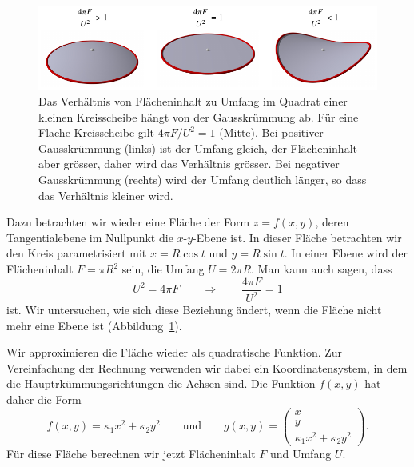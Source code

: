 \begin{figure}
\centering
\includegraphics{chapters/tikz/4pifu2.pdf}
\caption{Das Verhältnis von Flächeninhalt zu Umfang im Quadrat einer
kleinen Kreisscheibe hängt von der Gausskrümmung ab. 
Für eine Flache Kreisscheibe gilt $4\pi F/U^2=1$ (Mitte).
Bei positiver Gausskrümmung (links) ist der Umfang gleich, der Flächeninhalt
aber grösser, daher wird das Verhältnis grösser.
Bei negativer Gausskrümmung (rechts) wird der Umfang deutlich länger, so dass
das Verhältnis kleiner wird.
\label{skript:kurven:4pifu2vis}}
\end{figure}
Dazu betrachten wir wieder eine Fläche der Form $z=f(x,y)$, deren
Tangentialebene im Nullpunkt die $x$-$y$-Ebene ist.
In dieser Fläche betrachten wir den Kreis parametrisiert mit
$x=R\cos t$ und $y=R\sin t$.
In einer Ebene wird der Flächeninhalt $F=\pi R^2$ sein, die Umfang $U=2\pi R$.
Man kann auch sagen, dass
\[
U^2 = 4\pi F
\qquad\Rightarrow\qquad
\frac{4\pi F}{U^2}=1
\]
ist.
Wir untersuchen, wie sich diese Beziehung ändert, wenn die
Fläche nicht mehr eine Ebene ist (Abbildung~\ref{skript:kurven:4pifu2vis}).

Wir approximieren die Fläche wieder als quadratische Funktion.
Zur Vereinfachung der Rechnung verwenden wir dabei ein Koordinatensystem,
in dem die Hauptrkümmungsrichtungen die Achsen sind.
Die Funktion $f(x,y)$ hat daher die Form
\[
f(x,y)
=
\kappa_1 x^2 + \kappa_2 y^2
\qquad\text{und}\qquad
g(x,y)=\begin{pmatrix}x\\y\\\kappa_1x^2 + \kappa_2y^2\end{pmatrix}.
\]
Für diese Fläche berechnen wir jetzt Flächeninhalt $F$ und 
Umfang $U$.

